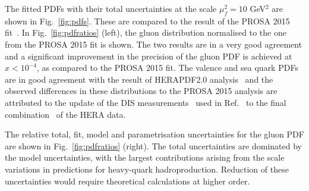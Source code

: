 \documentclass[12pt]{article}
\begin{document}
The fitted PDFs with their total uncertainties at the scale $\mu^2_f=10$ GeV$^2$ are shown in Fig.~\ref{fig:pdfs}. These are compared to the result of the PROSA 2015 fit~\cite{Zenaiev:2015rfa}. In Fig.~\ref{fig:pdfratios} (left), the gluon distribution 
normalised to the one from the PROSA 2015 fit is shown. The two results are in a very good agreement and a significant improvement 
in the precision of the gluon PDF is achieved at $x < 10^{-4}$, as compared to the PROSA 2015 fit. 
The valence and sea quark PDFs are in good agreement with the result of HERAPDF2.0 analysis~\cite{Abramowicz:2015mha} and the 
observed differences in these distributions to the PROSA 2015 analysis are attributed to the update of the DIS measurements~\cite{Aaron:2009aa} used in Ref.~\cite{Zenaiev:2015rfa} to the final combination~\cite{Abramowicz:2015mha} of the HERA data.

The relative total, fit, model and parametrisation uncertainties for the gluon PDF are shown in Fig.~\ref{fig:pdfratios} (right). 
The total uncertainties are dominated by the model uncertainties, with the largest contributions arising from the scale 
variations in predictions for heavy-quark hadroproduction. Reduction of these uncertainties would require theoretical calculations at higher order.
\end{document}
